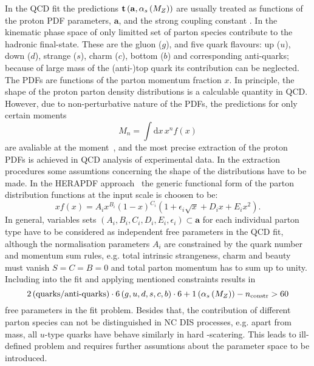 In the QCD fit the predictions $\mathbf{t}\left( \mathbf{a},\mbox{$\alpha_{s}\left(M_{Z}\right)$}\right)$ are usually treated as functions of the proton PDF parameters, $\mathbf{a}$, and the strong coupling constant \asz. In the kinematic phase space of \hera only limitted set of parton species contribute to the hadronic final-state. These are the gluon ($g$), and five quark flavours: up ($u$), down ($d$), strange ($s$), charm ($c$), bottom ($b$) and corresponding anti-quarks; because of large mass of the (anti-)top quark its contribution can be neglected. The PDFs are functions of the parton momentum fraction $x$. In principle, the shape of the proton parton density distributions is a calculable quantity in QCD. However, due to non-perturbative nature of the PDFs, the predictions for only certain moments 
\begin{equation}
 M_n=\int\mathrm{d}x\,x^n f\left(x\right)
\end{equation}
are avaliable at the moment~\cite{Hagler:2009ni}, and the most precise extraction of the proton PDFs is achieved in QCD analysis of experimental data. In the extraction procedures some assumtions concerning the shape of the distributions have to be made. In the HERAPDF approach~\cite{Aaron:2009aa} the generic functional form of the parton distribution functions at the input scale is choosen to be:
\begin{equation}
 xf\left(x\right) = A_ix^{B_i}\left(1-x\right)^{C_i}\left(1+\epsilon_i\sqrt{x}+D_ix+E_ix^2\right).
 \label{eq:pdfansatz}
\end{equation}
In general, variables sets $\left(A_i,B_i,C_i,D_i,E_i,\epsilon_i\right)\subset\mathbf{a}$ for each individual parton type have to be considered as independent free parameters in the QCD fit, although the normalisation parameters $A_i$ are constrained by the quark number and momentum sum rules, e.g. total intrinsic strangeness, charm and beauty must vanish $S=C=B=0$ and total parton momentum has to sum up to unity. Including \asz into the fit and applying mentioned constraints results in 
\begin{equation}
2 \left( \text{quarks/anti-quarks}\right)\cdot 6\left(g,u,d,s,c,b\right)\cdot 6 + 1\left(\mbox{$\alpha_{s}\left(M_{Z}\right)$}\right) - n_\text{constr} > 60
\end{equation}
free parameters in the fit problem. Besides that, the contribution of different parton species can not be distinguished in NC DIS processes, e.g. apart from mass, all $u$-type quarks have behave similarly in hard \ep-scatering. 
This leads to ill-defined problem and requires further assumtions about the parameter space to be introduced. 

